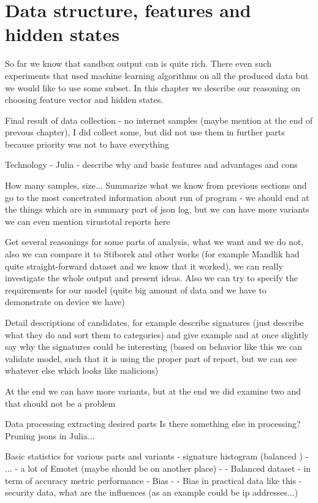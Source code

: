 \chapter{Data structure, features and hidden states}
So far we know that sandbox output can is quite rich. There even such experiments that used machine learning algorithms on all the produced data but we would like to use some subset. In this chapter we describe our reasoning on choosing feature vector and hidden states.

Final result of data collection - no internet samples (maybe mention at the end of prevous chapter), I did collect some, but did not use them in further parts because priority was not to have everything

Technology - Julia
  - describe why and basic features and advantages and cons


How many samples, size...
Summarize what we know from previous sections and go to the most concetrated information about run of program - we should end at the things which are in summary part of json log, but we can have more variants
we can even mention virustotal reports here

Get several reasonings for some parts of analysis, what we want and we do not, also we can compare it to Stiborek and other works (for example Mandlik had quite straight-forward dataset and we know that it worked), we can really investigate the whole output and present ideas. Also we can try to specify the requirements for our model (quite big amount of data and we have to demonstrate on device we have)


Detail descriptions of candidates, for example describe signatures (just describe what they do and sort them to categories) and give example and at once slightly say why the signatures could be interesting (based on behavior like this we can validate model, such that it is using the proper part of report, but we can see whatever else which looks like malicious)

At the end we can have more variants, but at the end we did examine two and that should not be a problem

Data processing
extracting desired parts
Is there something else in processing?
Pruning jsons in Julia...

Basic statistics for various parts and variants
  - signature histogram (balanced )
  - ...
  - a lot of Emotet (maybe should be on another place)
  - - Balanced dataset - in term of accuracy metric performance
  - Bias - - Bias in practical data like this - security data, what are the influences (as an example could be ip addresses...)



